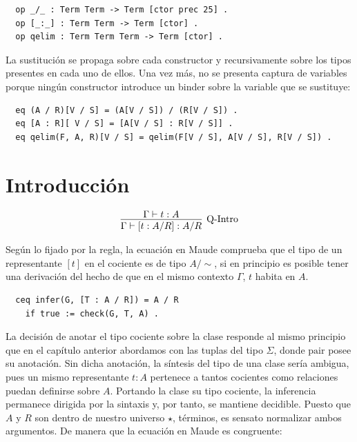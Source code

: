 \begin{lstlisting}
  op _/_ : Term Term -> Term [ctor prec 25] .
  op [_:_] : Term Term -> Term [ctor] .
  op qelim : Term Term Term -> Term [ctor] .
\end{lstlisting}

\indent La sustitución se propaga sobre cada constructor y recursivamente sobre los tipos presentes en cada uno de ellos. Una vez más, no se presenta captura de variables porque ningún constructor introduce un binder sobre la variable que se sustituye:
\begin{lstlisting}
  eq (A / R)[V / S] = (A[V / S]) / (R[V / S]) .
  eq [A : R][ V / S] = [A[V / S] : R[V / S]] .
  eq qelim(F, A, R)[V / S] = qelim(F[V / S], A[V / S], R[V / S]) .
\end{lstlisting}

\section{Introducción}

\begin{gather}
  \infer[\text{Q-Intro}]
  {\Gamma \vdash [t : A / R] : A / R}
  {\Gamma \vdash t : A}
\end{gather}

Según lo fijado por la regla, la ecuación en Maude comprueba que el tipo de un representante $[t]$ en el cociente es de tipo $A/\sim$, si en principio es posible tener una derivación del hecho de que en el mismo contexto $\Gamma$, $t$ habita en $A$.
\newline
\begin{lstlisting}
  ceq infer(G, [T : A / R]) = A / R
    if true := check(G, T, A) .
\end{lstlisting}

\indent La decisión de anotar el tipo cociente sobre la clase responde al mismo principio que en el capítulo anterior abordamos con las tuplas del tipo $\Sigma$, donde $\mathrm{pair}$ posee su anotación. Sin dicha anotación, la síntesis del tipo de una clase sería ambigua, pues un mismo representante $t : A$ pertenece a tantos cocientes como relaciones puedan definirse sobre $A$. Portando la clase su tipo cociente, la inferencia permanece dirigida por la sintaxis y, por tanto, se mantiene decidible.
\newline
\newline
\indent Puesto que $A$ y $R$ son dentro de nuestro universo $\star$, términos, es sensato normalizar ambos argumentos. De manera que la ecuación en Maude es congruente:

